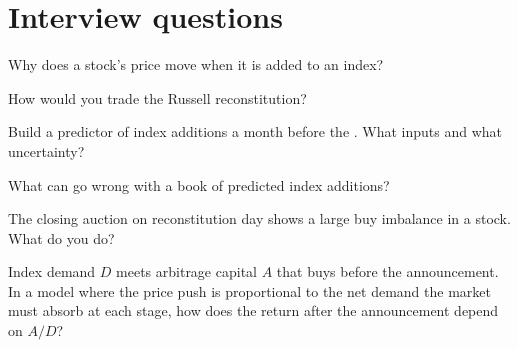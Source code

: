 \section{Interview questions}

\begin{interviewq}\label{iq:s1:index-rebalancing:1}
Why does a stock's price move when it is added to an index?
\end{interviewq}

\begin{interviewq}\label{iq:s1:index-rebalancing:2}
How would you trade the Russell reconstitution?
\end{interviewq}

\begin{interviewq}\label{iq:s1:index-rebalancing:3}
Build a predictor of index additions a month before the . What inputs and what uncertainty?
\end{interviewq}

\begin{interviewq}\label{iq:s1:index-rebalancing:4}
What can go wrong with a book of predicted index additions?
\end{interviewq}

\begin{interviewq}\label{iq:s1:index-rebalancing:5}
The closing auction on reconstitution day shows a large buy imbalance in a stock. What do you do?
\end{interviewq}

\begin{interviewq}\label{iq:s1:index-rebalancing:6}
Index demand $D$ meets arbitrage capital $A$ that buys before the announcement. In a model where the price push is proportional to the net demand the
market must absorb at each stage, how does the return after the announcement depend on $A/D$?
\end{interviewq}
